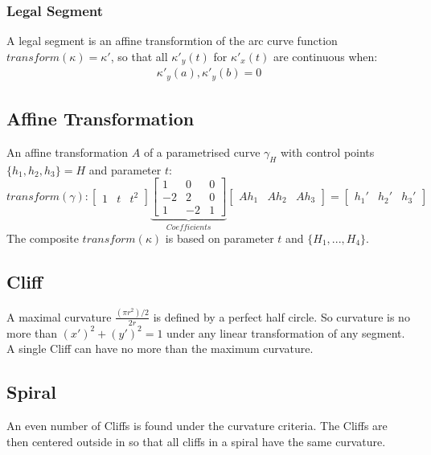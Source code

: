 \documentclass{article}
\begin{document}
\subsubsection{Legal Segment}
A legal segment is an affine transformtion of the arc curve function $transform(\kappa) = \kappa'$, so that all $\kappa'_{y}(t)$ for $\kappa'_{x}(t)$ are continuous when:
\begin{align}
\kappa'_{y}(a), \kappa'_{y}(b) = 0
\end{align}

\subsection{Affine Transformation}
An affine transformation $A$ of a parametrised curve $\gamma_{H}$ with control points $\{h_{1},h_{2},h_{3}\} = H$ and parameter $t$:
\begin{equation}
transform(\gamma):
\begin{bmatrix}
1 & t & t^2
\end{bmatrix}
\underbrace{\begin{bmatrix}
1 & 0 & 0\\
-2 & 2 & 0\\
1 & -2 &1
\end{bmatrix}}_{Coefficients}
\begin{bmatrix}
Ah_{1} & Ah_{2} & Ah_{3}
\end{bmatrix}
=
\begin{bmatrix}
h_{1}' & h_{2}' & h_{3}'
\end{bmatrix}
\end{equation}
The composite $transform(\kappa)$ is based on parameter $t$ and $\{H_{1}, ... ,H_{4}\}$.

\subsection{Cliff}
A maximal curvature $\frac{(\pi r^2) /2}{2r}$ is defined by a perfect half circle. So curvature is no more than $(x')^2 + (y')^2 =1$  under any linear transformation of any segment.
A single Cliff can have no more than the maximum curvature.

\subsection{Spiral}
An even number of Cliffs is found under the curvature criteria.
The Cliffs are then centered outside in so that all cliffs in a spiral have the same curvature.
\end{document}
